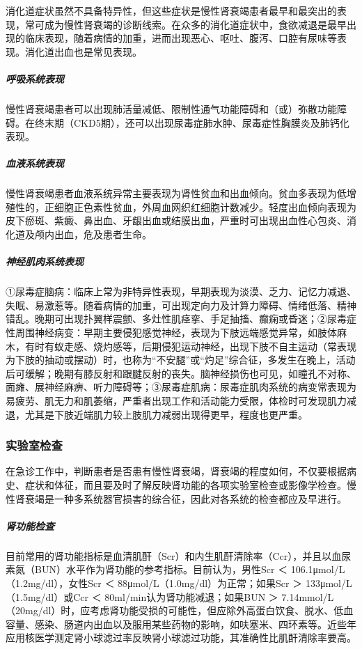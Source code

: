 消化道症状虽然不具备特异性，但这些症状是慢性肾衰竭患者最早和最突出的表现，常可成为慢性肾衰竭的诊断线索。在众多的消化道症状中，食欲减退是最早出现的临床表现，随着病情的加重，进而出现恶心、呕吐、腹泻、口腔有尿味等表现。消化道出血也是常见表现。

\subparagraph{呼吸系统表现}

慢性肾衰竭患者可以出现肺活量减低、限制性通气功能障碍和（或）弥散功能障碍。在终末期（CKD5期），还可以出现尿毒症肺水肿、尿毒症性胸膜炎及肺钙化表现。

\subparagraph{血液系统表现}

慢性肾衰竭患者血液系统异常主要表现为肾性贫血和出血倾向。贫血多表现为低增殖性的，正细胞正色素性贫血，外周血网织红细胞计数减少。轻度出血倾向表现为皮下瘀斑、紫癜、鼻出血、牙龈出血或结膜出血，严重时可出现出血性心包炎、消化道及颅内出血，危及患者生命。

\subparagraph{神经肌肉系统表现}

①尿毒症脑病：临床上常为非特异性表现，早期表现为淡漠、乏力、记忆力减退、失眠、易激惹等。随着病情的加重，可出现定向力及计算力障碍、情绪低落、精神错乱。晚期可出现扑翼样震颤、多灶性肌痉挛、手足抽搐、癫痫或昏迷；②尿毒症性周围神经病变：早期主要侵犯感觉神经，表现为下肢远端感觉异常，如肢体麻木，有时有蚁走感、烧灼感等，后期侵犯运动神经，出现下肢不自主运动（常表现为下肢的抽动或摆动）时，也称为“不安腿”或“灼足”综合征，多发生在晚上，活动后可缓解；晚期有膝反射和跟腱反射的丧失。脑神经损伤也可见，如瞳孔不对称、面瘫、展神经麻痹、听力障碍等；③尿毒症肌病：尿毒症肌肉系统的病变常表现为易疲劳、肌无力和肌萎缩，严重者出现工作和活动能力受限，体检时可发现肌力减退，尤其是下肢近端肌力较上肢肌力减弱出现得更早，程度也更严重。

\subsubsection{实验室检查}

在急诊工作中，判断患者是否患有慢性肾衰竭，肾衰竭的程度如何，不仅要根据病史、症状和体征，而且要及时了解反映肾功能的各项实验室检查或影像学检查。慢性肾衰竭是一种多系统器官损害的综合征，因此对各系统的检查都应及早进行。

\subparagraph{肾功能检查}

目前常用的肾功能指标是血清肌酐（Scr）和内生肌酐清除率（Ccr），并且以血尿素氮（BUN）水平作为肾功能的参考指标。目前认为，男性Scr
＜ 106.1μmol/L （1.2mg/dl），女性Scr ＜
88μmol/L（1.0mg/dl）为正常；如果Scr ＞ 133μmol/L（1.5mg/dl）或Ccr ＜
80ml/min认为肾功能减退；如果BUN ＞
7.14mmol/L（20mg/dl）时，应考虑肾功能受损的可能性，但应除外高蛋白饮食、脱水、低血容量、感染、肠道内出血以及服用某些药物的影响，如呋塞米、四环素等。近些年应用核医学测定肾小球滤过率反映肾小球滤过功能，其准确性比肌酐清除率要高。


